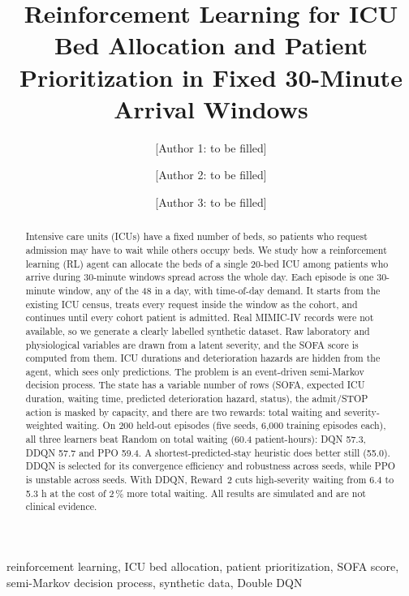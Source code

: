 \documentclass{rlreport}
\begin{document}
\title{Reinforcement Learning for ICU Bed Allocation and Patient Prioritization in Fixed 30-Minute Arrival Windows}

\author{[Author 1: to be filled] \and [Author 2: to be filled] \and [Author 3: to be filled]}

\maketitle
\begin{abstract}
Intensive care units (ICUs) have a fixed number of beds, so patients who request admission may have to wait while others occupy beds. We study how a reinforcement learning (RL) agent can allocate the beds of a single 20-bed ICU among patients who arrive during 30-minute windows spread across the whole day. Each episode is one 30-minute window, any of the 48 in a day, with time-of-day demand. It starts from the existing ICU census, treats every request inside the window as the cohort, and continues until every cohort patient is admitted. Real MIMIC-IV records were not available, so we generate a clearly labelled synthetic dataset. Raw laboratory and physiological variables are drawn from a latent severity, and the SOFA score is computed from them. ICU durations and deterioration hazards are hidden from the agent, which sees only predictions. The problem is an event-driven semi-Markov decision process. The state has a variable number of rows (SOFA, expected ICU duration, waiting time, predicted deterioration hazard, status), the admit/STOP action is masked by capacity, and there are two rewards: total waiting and severity-weighted waiting. On 200 held-out episodes (five seeds, 6{,}000 training episodes each), all three learners beat Random on total waiting (60.4 patient-hours): DQN 57.3, DDQN 57.7 and PPO 59.4. A shortest-predicted-stay heuristic does better still (55.0). DDQN is selected for its convergence efficiency and robustness across seeds, while PPO is unstable across seeds. With DDQN, Reward~2 cuts high-severity waiting from 6.4 to 5.3 h at the cost of 2\,\% more total waiting. All results are simulated and are not clinical evidence.
\end{abstract}

\begin{keywords}
reinforcement learning, ICU bed allocation, patient prioritization, SOFA score, semi-Markov decision process, synthetic data, Double DQN
\end{keywords}
\end{document}
